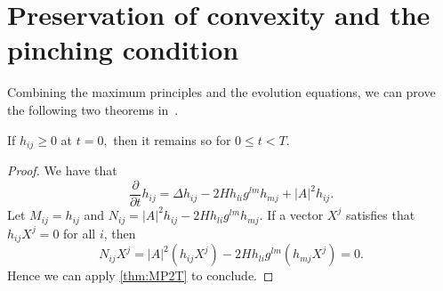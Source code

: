 \section{Preservation of convexity and the pinching condition}
Combining the maximum principles and the evolution equations, we can prove the following two theorems in~\cite[Section 4]{huisken_flow_1984}.
\begin{theorem}
	If $h_{ij}^{} \geq 0 $ at $t=0,$ then it remains so for $0 \leq t < T.$ 
\end{theorem}
\begin{proof}
	We have that \[\frac{\partial }{\partial t} h_{ij}^{} = \Delta h_{ij}^{} - 2 H h_{li }^{} g_{}^{lm } h_{mj}^{} + \left| A \right| ^2 h_{ij}^{}.\]
	Let $M_{ij }^{} = h_{ij }^{} $ and $N_{ij }^{} = \left| A \right| ^2 h_{ij }^{} - 2 H h_{li }^{} g_{}^{lm } h_{mj}^{}.$
	If a vector $X^j$ satisfies that $h_{ij }^{} X^j=0$ for all $i$, then
	\[N_{ij }^{} X^j = \left| A \right| ^2 (h_{ij }^{} X^j) - 2 H h_{li }^{} g_{}^{lm } (h_{mj}^{}X^j)=0.\]
	Hence we can apply \autoref{thm:MP2T} to conclude.
\end{proof}

